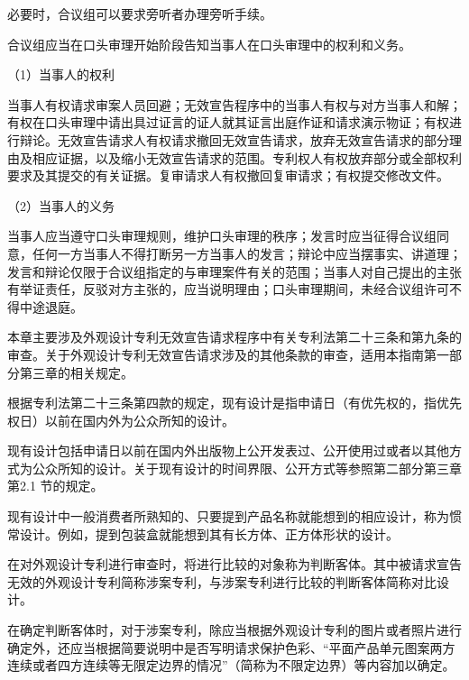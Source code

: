 必要时，合议组可以要求旁听者办理旁听手续。

合议组应当在口头审理开始阶段告知当事人在口头审理中的权利和义务。

{\setlength{\parindent}{17.1bp}（1）当事人的权利\par}

当事人有权请求审案人员回避；无效宣告程序中的当事人有权与对方当事人和解；有权在口头审理中请出具过证言的证人就其证言出庭作证和请求演示物证；有权进行辩论。无效宣告请求人有权请求撤回无效宣告请求，放弃无效宣告请求的部分理由及相应证据，以及缩小无效宣告请求的范围。专利权人有权放弃部分或全部权利要求及其提交的有关证据。复审请求人有权撤回复审请求；有权提交修改文件。

{\setlength{\parindent}{17.1bp}（2）当事人的义务\par}

当事人应当遵守口头审理规则，维护口头审理的秩序；发言时应当征得合议组同意，任何一方当事人不得打断另一方当事人的发言；辩论中应当摆事实、讲道理；发言和辩论仅限于合议组指定的与审理案件有关的范围；当事人对自己提出的主张有举证责任，反驳对方主张的，应当说明理由；口头审理期间，未经合议组许可不得中途退庭。

本章主要涉及外观设计专利无效宣告请求程序中有关专利法第二十三条和第九条的审查。关于外观设计专利无效宣告请求涉及的其他条款的审查，适用本指南第一部分第三章的相关规定。

根据专利法第二十三条第四款的规定，现有设计是指申请日（有优先权的，指优先权日）以前在国内外为公众所知的设计。

现有设计包括申请日以前在国内外出版物上公开发表过、公开使用过或者以其他方式为公众所知的设计。关于现有设计的时间界限、公开方式等参照第二部分第三章第2.1 节的规定。

现有设计中一般消费者所熟知的、只要提到产品名称就能想到的相应设计，称为惯常设计。例如，提到包装盒就能想到其有长方体、正方体形状的设计。

在对外观设计专利进行审查时，将进行比较的对象称为判断客体。其中被请求宣告无效的外观设计专利简称涉案专利，与涉案专利进行比较的判断客体简称对比设计。

在确定判断客体时，对于涉案专利，除应当根据外观设计专利的图片或者照片进行确定外，还应当根据简要说明中是否写明请求保护色彩、“平面产品单元图案两方连续或者四方连续等无限定边界的情况”（简称为不限定边界）等内容加以确定。

